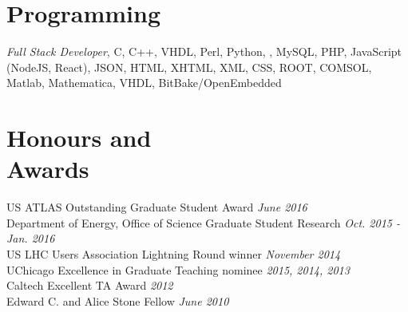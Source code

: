 \documentclass[margin,line]{resume}
\let\origsection\section%
\let\section\subsection%
\let\section\origsection%
\begin{document}
\begin{resume}
\section{\mysidestyle Programming}

\textsl{Full Stack Developer}, C, C++, VHDL, Perl, Python, \LaTeXe, MySQL, PHP, JavaScript (NodeJS, React), JSON, HTML, XHTML, XML, CSS, ROOT, COMSOL, Matlab, Mathematica, VHDL, BitBake/OpenEmbedded

\section{\mysidestyle Honours and\\Awards}

US ATLAS Outstanding Graduate Student Award \hfill \textsl{June 2016}\\
Department of Energy, Office of Science Graduate Student Research \hfill \textsl{Oct. 2015 - Jan. 2016}\\
US LHC Users Association Lightning Round winner \hfill \textsl{November 2014}\\
UChicago Excellence in Graduate Teaching nominee \hfill \textsl{2015, 2014, 2013}\\
Caltech Excellent TA Award \hfill \textsl{2012}\\
Edward C. and Alice Stone Fellow \hfill \textsl{June 2010}

\end{resume}
\end{document}
